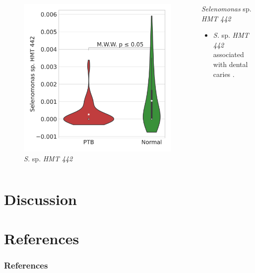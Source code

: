 \documentclass{beamer}
\begin{document}
\begin{frame}[allowframebreaks]
        \begin{columns}
            \begin{column}{0.4 \linewidth}
                \begin{figure}
                    \includegraphics[width=\linewidth]{figures/RandomForest_Proportion/singleton-RF.DADA2.homd.Mouth/Violin_3.pdf}
                    \caption{\textit{S.} sp. \textit{HMT 442}}
                \end{figure}
            \end{column}
            \begin{column}{0.6 \linewidth}
                \begin{block}{\textit{Selenomonas} sp. \textit{HMT 442}}
                    \begin{itemize}
                        \item \textit{S.} sp. \textit{HMT 442} associated with dental caries \cite{Selenomonas-1}.
                    \end{itemize}
                \end{block}
            \end{column}
        \end{columns}
    \end{frame}

    \section{Discussion}

    \section{References}
   	\begin{frame}[allowframebreaks]
        \frametitle{References}
        
        
    \end{frame}
\end{document}
